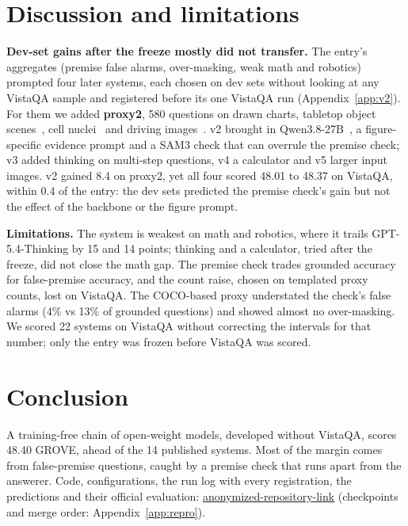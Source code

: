 \documentclass{article}
\begin{document}
\section{Discussion and limitations}\label{sec:disc}
\textbf{Dev-set gains after the freeze mostly did not transfer.} The entry's aggregates (premise false alarms, over-masking,
weak math and robotics) prompted four later systems, each chosen on dev sets without looking at any VistaQA sample and
registered before its one VistaQA run (Appendix~\ref{app:v2}). For them we added \textbf{proxy2}, 580 questions on drawn charts,
tabletop object scenes~\cite{bop23,posecnn,lmo}, cell nuclei~\cite{dsb2018} and driving images~\cite{bdd100k}. v2 brought in
Qwen3.8-27B~\cite{qwen38}, a figure-specific evidence prompt and a SAM3 check that can overrule the premise check; v3 added
thinking on multi-step questions, v4 a calculator and v5 larger input images. v2 gained 8.4 on proxy2, yet all four scored 48.01
to 48.37 on VistaQA, within 0.4 of the entry: the dev sets predicted the premise check's gain but not the effect of the backbone
or the figure prompt.

\textbf{Limitations.} The system is weakest on math and robotics, where it trails GPT-5.4-Thinking by 15 and 14 points; thinking
and a calculator, tried after the freeze, did not close the math gap. The premise check trades grounded accuracy for
false-premise accuracy, and the count raise, chosen on templated proxy counts, lost on VistaQA. The COCO-based proxy understated
the check's false alarms (4\% vs 13\% of grounded questions) and showed almost no over-masking. We scored 22 systems on VistaQA without correcting the
intervals for that number; only the entry was frozen before VistaQA was scored.

\section{Conclusion}
A training-free chain of open-weight models, developed without VistaQA, scores 48.40 GROVE, ahead of the 14 published systems.
Most of the margin comes from false-premise questions, caught by a premise check that runs apart from the answerer. Code,
configurations, the run log with every registration, the predictions and their official evaluation:
\url{anonymized-repository-link} (checkpoints and merge order: Appendix~\ref{app:repro}).



\end{document}
